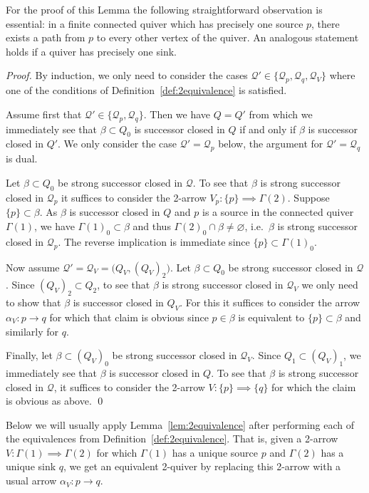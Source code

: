 \documentclass[smallextended,envcountsect,envcountsame]{svjour3}
\numberwithin{equation}{section}
\newcommand{\cQ}{\mathcal{Q}}
\begin{document}
For the proof of this Lemma the following straightforward observation is essential: in a finite connected quiver which has precisely one source $p$, there exists a path from $p$ to every other vertex of the quiver.
An analogous statement holds if a quiver has precisely one sink. 
\begin{proof}
  By induction, we only need to consider the cases $\cQ'\in\{\cQ_p,\cQ_q,\cQ_V\}$ where one of the conditions of Definition~\ref{def:2equivalence} is satisfied.

  Assume first that $\cQ'\in\{\cQ_p,\cQ_q\}$.
  Then we have $Q=Q'$ from which we immediately see that $\beta\subset Q_0$ is successor closed in $Q$ if and only if $\beta$ is successor closed in $Q'$.
  We only consider the case $\cQ'=\cQ_p$ below, the argument for $\cQ'=\cQ_q$ is dual.

  Let $\beta\subset Q_0$ be strong successor closed in $\cQ$.
  To see that $\beta$ is strong successor closed in $\cQ_p$ it suffices to consider the 2-arrow $V_p:\{p\}\implies\Gamma(2)$.
  Suppose $\{p\}\subset\beta$.
  As $\beta$ is successor closed in $Q$ and $p$ is a source in the connected quiver $\Gamma(1)$, we have $\Gamma(1)_0\subset\beta$ and thus $\Gamma(2)_0\cap\beta\ne\varnothing$, i.e.\ $\beta$ is strong successor closed in $\cQ_p$.
  The reverse implication is immediate since $\{p\}\subset\Gamma(1)_0$.

  Now assume $\cQ'=\cQ_V=\big(Q_V,(Q_V)_2\big)$. 
  Let $\beta\subset Q_0$ be strong successor closed in $\cQ$.
  Since $(Q_V)_2\subset Q_2$, to see that $\beta$ is strong successor closed in $\cQ_V$ we only need to show that $\beta$ is successor closed in $Q_V$.  
  For this it suffices to consider the arrow $\alpha_V:p\to q$ for which that claim is obvious since $p\in\beta$ is equivalent to $\{p\}\subset\beta$ and similarly for $q$.

  Finally, let $\beta\subset(Q_V)_0$ be strong successor closed in $\cQ_V$.
  Since $Q_1\subset(Q_V)_1$, we immediately see that $\beta$ is successor closed in $Q$.
  To see that $\beta$ is strong successor closed in $\cQ$, it suffices to consider the 2-arrow $V:\{p\}\implies\{q\}$ for which the claim is obvious as above.
\qed\end{proof}

\begin{remark}
  Below we will usually apply Lemma~\ref{lem:2equivalence} after performing each of the equivalences from Definition~\ref{def:2equivalence}.
  That is, given a 2-arrow $V:\Gamma(1)\implies\Gamma(2)$ for which $\Gamma(1)$ has a unique source $p$ and $\Gamma(2)$ has a unique sink $q$, we get an equivalent 2-quiver by replacing this 2-arrow with a usual arrow $\alpha_V:p\to q$.
\end{remark}
\end{document}
